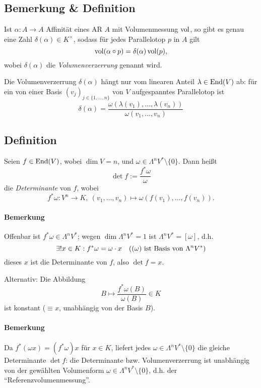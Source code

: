  \subsection{Bemerkung \& Definition}
 	\begin{Definition}[Volumenverzerrung]
 		Ist $ \alpha: A\to A $ Affinität eines AR $ A $ mit Volumenmessung $ \operatorname{vol} $, so gibt es genau eine Zahl $ \delta(\alpha)\in K^{\times} $, sodass für jedes Parallelotop $ p $ in $ A $ gilt
 		\[
 			\operatorname{vol}(\alpha\circ p) = \delta(\alpha)\operatorname{vol}(p),
 		\]
 		wobei $ \delta(\alpha) $ die \emph{Volumenverzerrung} genannt wird.

 		Die Volumenverzerrung $ \delta(\alpha) $ hängt nur vom linearen Anteil $ \lambda\in \operatorname{End}(V) $ ab: für ein von einer Basis $ (v_j)_{j\in \{1,\dots,n\}} $ von $ V $ aufgespanntes Parallelotop ist
 		\[
 			\delta(\alpha) = \frac{\omega(\lambda(v_1),\dots,\lambda(v_n))}{\omega(v_1,\dots,v_n)}
 		\]
 	\end{Definition}
 \subsection{Definition}
 	\begin{Definition}
 		Seien $ f\in\operatorname{End}(V) $, wobei $ \dim V=n $, und $ \omega\in \Lambda^nV^*\setminus \{0\} $. Dann heißt
 		\[
 			\det f:= \frac{f^*\omega}{\omega}
 		\]
 		die \emph{Determinante} von $ f $, wobei
 		\[
 			f^*\omega: V^n\to K,\ (v_1,\dots,v_n)\mapsto \omega(f(v_1),\dots,f(v_n)).
 		\]
 	\end{Definition}
 	\paragraph{Bemerkung}
 		Offenbar ist $ f^*\omega\in \Lambda^nV^*$; wegen $ \dim \Lambda^nV^*=1 $ ist $\Lambda^nV^* = [\omega]$, d.h.
 		\[
 			\exists! x\in K: f^*\omega = \omega \cdot x \quad\text{($(\omega) $ ist Basis von $ \Lambda^nV^* $)}
 		\]
 		dieses $ x $ ist die Determinante von $ f $, also $ \det f = x $.

 		Alternativ: Die Abbildung
 		\[
 			B\mapsto  \frac{f^*\omega(B)}{\omega(B)}\in K
 		\]
 		ist konstant ($ \equiv x $, unabhängig von der Basis $ B $).
 	\paragraph{Bemerkung}
 		Da $ f^*(\omega x) = (f^*\omega)x $ für $ x\in K $, liefert jedes $ \omega \in \Lambda^nV^*\setminus\{0\} $ die gleiche Determinante $ \det f $: die Determinante bzw. Volumenverzerrung ist unabhängig von der gewählten Volumenform $ \omega\in \Lambda^nV^*\setminus \{0\} $, d.h. der "`Referenzvolumenmessung"'.
